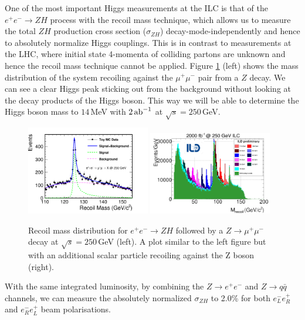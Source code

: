 One of the most important Higgs measurements at the ILC is that of the $e^+e^- \to ZH$ process with the recoil mass technique, which allows us to measure the total $ZH$ production cross section ($\sigma_{ZH}$) decay-mode-independently and hence to absolutely normalize Higgs couplings. This is in contrast to measurements at the LHC, where initial state 4-momenta of colliding partons are unknown and hence the recoil mass technique cannot be applied. Figure \ref{fig:Mhrecoilmm} (left) shows the mass distribution of the system recoiling against the $\mu^+\mu^-$ pair from a $Z$ decay\cite{Yan:2016xyx}. We can see a clear Higgs peak sticking out from the background without looking at the decay products of the Higgs boson. This way we will be able to determine the Higgs boson mass to $14$\,MeV with $2\,{\rm ab}^{-1}$ at $\sqrt{s}=250$\,GeV.
\begin{figure}[htbp]
\begin{center}
 \includegraphics[width=0.48\textwidth]{Science/fig/RecoilMassLep250.pdf}\hspace{2mm}
 \includegraphics[width=0.48\textwidth]{Science/fig/po_muon_kcut_recoil_mass_summary1.png}
\end{center}
\caption{Recoil mass distribution for $e^+e^- \to ZH$ followed by a $Z \to \mu^+\mu^-$ decay at $\sqrt{s}=250\,$GeV (left). A plot similar to the left figure but with an additional scalar particle recoiling against the Z boson (right). 
}
\label{fig:Mhrecoilmm}
\end{figure}
With the same integrated luminosity, by combining the $Z \to e^+e^-$ and $Z \to q\bar{q}$ channels, we can measure the absolutely normalized $\sigma_{ZH}$ to 2.0\% for both $e^-_Le^+_R$ and $e^-_Re^+_L$ beam polarisations.  
